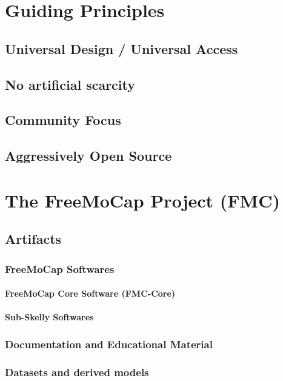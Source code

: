 \documentclass[11pt]{article}
\begin{document}
\section{Guiding Principles}
\subsection{Universal Design / Universal Access}
\subsection{No artificial scarcity}
\subsection{Community Focus}
\subsection{Aggressively Open Source}


\section{The FreeMoCap Project (FMC)}

\subsection{Artifacts}

\subsubsection{FreeMoCap Softwares}
\paragraph{FreeMoCap Core Software (FMC-Core)}
\paragraph{Sub-Skelly Softwares}

\subsubsection{Documentation and Educational Material}

\subsubsection{Datasets and derived models}
\end{document}
